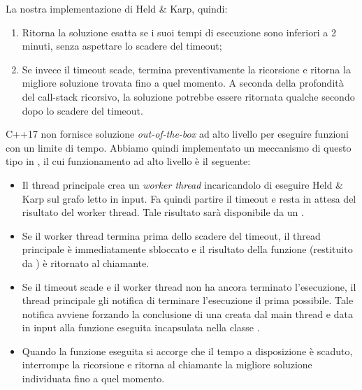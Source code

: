\noindent La nostra implementazione di Held \& Karp, quindi:

\begin{enumerate}
    \item Ritorna la soluzione esatta se i suoi tempi di esecuzione sono inferiori a 2 minuti, senza aspettare lo scadere del timeout;
    \item Se invece il timeout scade, termina preventivamente la ricorsione e ritorna la migliore soluzione trovata fino a quel momento. A seconda della profondità del call-stack ricorsivo, la soluzione potrebbe essere ritornata qualche secondo dopo lo scadere del timeout.
\end{enumerate}

\noindent C++17 non fornisce soluzione \textit{out-of-the-box} ad alto livello per eseguire funzioni con un limite di tempo. Abbiamo quindi implementato un meccanismo di questo tipo in , il cui funzionamento ad alto livello è il seguente:

\begin{itemize}
    \item Il thread principale crea un \textit{worker thread} incaricandolo di eseguire Held \& Karp sul grafo letto in input. Fa quindi partire il timeout e resta in attesa del risultato del worker thread. Tale risultato sarà disponibile da un .
    \item Se il worker thread termina prima dello scadere del timeout, il thread principale è immediatamente sbloccato e il risultato della funzione (restituito da ) è ritornato al chiamante.
    \item Se il timeout scade e il worker thread non ha ancora terminato l'esecuzione, il thread principale gli notifica di terminare l'esecuzione il prima possibile. Tale notifica avviene forzando la conclusione di una  creata dal main thread e data in input alla funzione eseguita incapsulata nella classe .
    \item Quando la funzione eseguita si accorge che il tempo a disposizione è scaduto, interrompe la ricorsione e ritorna al chiamante la migliore soluzione individuata fino a quel momento.
\end{itemize}
